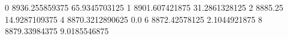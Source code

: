 0 8936.255859375 65.9345703125
1 8901.607421875 31.2861328125
2 8885.25 14.9287109375
4 8870.3212890625 0.0
6 8872.42578125 2.1044921875
8 8879.33984375 9.0185546875
